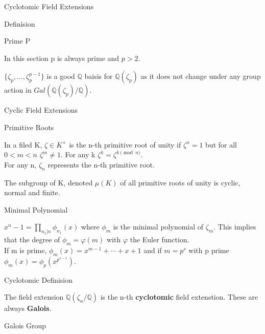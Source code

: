 \documentclass[12pt, letterpaper]{article}
\newcommand{\Q}{\mathbb{Q}}
\begin{document}
\begin{section}{Cyclotomic Field Extensions}
\begin{subsection}{Definision}
    \begin{subsubsection}{Prime P}

      In this section p is always prime and \(p > 2\).

      \(\{\zeta_{p}, \dots , \zeta^{p - 1}_{p}\}\) is a good \(\Q\) baisis for
      \(\Q(\zeta_{p})\) as it does not change under any group action in
      \(Gal(\Q(\zeta_{p}) / \Q)\). \\
    \end{subsubsection}

  \end{subsection}

\end{section}

\begin{section}{Cyclic Field Extensions}

  \begin{subsection}{Primitive Roots}

    In a filed K, \(\zeta \in K^{\times}\) is the n-th primitive root of unity
    if \(\zeta^{n} = 1\) but for all \(0 < m < n\) \(\zeta^{m} \neq 1\). For
    any k \(\zeta^{k} = \zeta^{k \pmod{n}}\). \\
    For any n, \(\zeta_{n}\) represents the n-th primitive root.

    The subgroup of K, denoted \(\mu(K)\) of all primitive roots of unity is
    cyclic, normal and finite.

    \begin{subsubsection}{Minimal Polynomial}

      \(x^{n} - 1 = \prod_{n_{1} | n} \phi_{n_{1}}(x)\) where \(\phi_{m}\) is
      the minimal polynomial of \(\zeta_{m}\). This implies that the degree of
      \(\phi_{m} = \varphi(m)\) with \(\varphi\) the Euler function. \\
      If m is prime, \(\phi_{m}(x) = x^{m - 1} + \cdots + x + 1\) and if
      \(m = p^{s}\) with p prime \(\phi_{m}(x) = \phi_{p}(x^{p^{s - 1}})\).

    \end{subsubsection}

  \end{subsection}

  \begin{subsection}{Cyclotomic Definision}

    The field extension \(\Q(\zeta_{n} / \Q)\) is  the n-th \textbf{cyclotomic}
    field extenstion. These are always \textbf{Galois}.

    \begin{subsubsection}{Galois Group}


\end{subsubsection}
\end{subsection}
\end{section}
\end{document}
